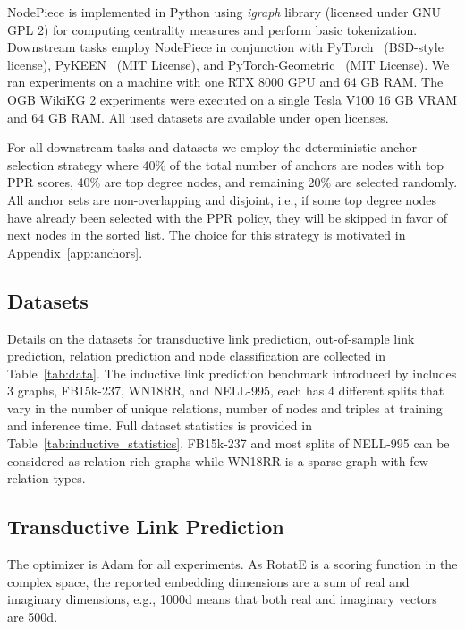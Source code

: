 \documentclass{article} \usepackage{iclr2022_conference,times}
\begin{document}
NodePiece is implemented in Python using \emph{igraph} library (licensed under GNU GPL 2) for computing centrality measures and perform basic tokenization. 
Downstream tasks employ NodePiece in conjunction with PyTorch~\citep{DBLP:conf/nips/PaszkeGMLBCKLGA19} (BSD-style license), PyKEEN~\citep{ali2021pykeen} (MIT License), and PyTorch-Geometric~\citep{Fey/Lenssen/2019} (MIT License). 
We ran experiments on a machine with one RTX 8000 GPU and 64 GB RAM. The OGB WikiKG 2 experiments were executed on a single Tesla V100 16 GB VRAM and 64 GB RAM.
All used datasets are available under open licenses.

For all downstream tasks and datasets we employ the deterministic anchor selection strategy where 40\% of the total number of anchors  are nodes with top PPR scores, 40\% are top degree nodes, and remaining 20\% are selected randomly.
All anchor sets are non-overlapping and disjoint, i.e., if some top degree nodes have already been selected with the PPR policy, they will be skipped in favor of next nodes in the sorted list. 
The choice for this strategy is motivated in Appendix~\ref{app:anchors}.

\subsection{Datasets}
\label{app:datasets}

Details on the datasets for transductive link prediction, out-of-sample link prediction, relation prediction and node classification are collected in Table~\ref{tab:data}.
The inductive link prediction benchmark introduced by \citet{DBLP:conf/icml/TeruDH20} includes 3 graphs, FB15k-237, WN18RR, and NELL-995, each has 4 different splits that vary in the number of unique relations, number of nodes and triples at training and inference time. 
Full dataset statistics is provided in Table~\ref{tab:inductive_statistics}. 
FB15k-237 and most splits of NELL-995 can be considered as relation-rich graphs while WN18RR is a sparse graph with few relation types.

\subsection{Transductive Link Prediction}
The optimizer is Adam for all experiments. 
As RotatE is a scoring function in the complex space, the reported embedding dimensions are a sum of real and imaginary dimensions, e.g., 1000d means that both real and imaginary vectors are 500d. 
\end{document}

